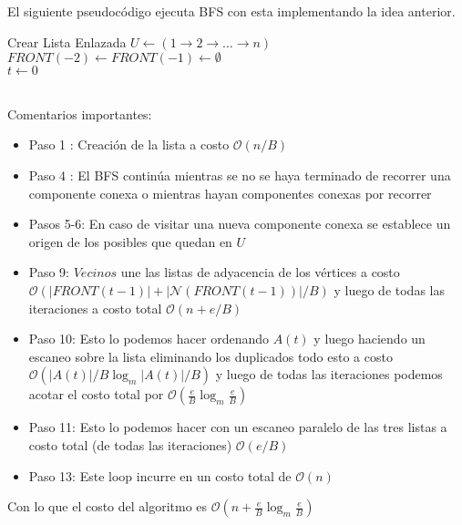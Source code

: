 \documentclass[dcc,uchile]{fcfmcourse}
\theoremstyle{plain}
\theoremstyle{definition}
\begin{document}
\begin{problems}
El siguiente pseudocódigo ejecuta BFS con esta implementando la idea anterior.
\begin{algorithm}
Crear Lista Enlazada $U \gets (1\to 2\to \ldots \to n)$\\
$FRONT(-2)\gets FRONT(-1) \gets \emptyset$\\
$t\gets 0$\\
\end{algorithm}\\

Comentarios importantes:
\begin{itemize}
    \item Paso 1 : Creación de la lista a costo $\mathcal{O}(n/B)$
    \item Paso 4 : El BFS continúa mientras se no se haya terminado de recorrer una componente conexa o mientras hayan componentes conexas por recorrer
    \item Pasos 5-6: En caso de visitar una nueva componente conexa se establece un origen de los posibles que quedan en $U$
    \item Paso 9: $Vecinos$ une las listas de adyacencia de los vértices a costo $\mathcal{O}(|FRONT(t-1)| + |\mathcal{N}(FRONT(t-1))|/B)$ y luego de todas las iteraciones a costo total $\mathcal{O}(n + e/B)$
    \item Paso 10: Esto lo podemos hacer ordenando $A(t)$ y luego haciendo un escaneo sobre la lista eliminando los duplicados todo esto a costo $\mathcal{O}(|A(t)|/B\log_m |A(t)|/B)$ y luego de todas las iteraciones podemos acotar el costo total por $\mathcal{O}(\frac{e}{B}\log_{m} \frac{e}{B})$
    \item Paso 11: Esto lo podemos hacer con un escaneo paralelo de las tres listas a costo total (de todas las iteraciones) $\mathcal{O}(e/B)$
    \item Paso 13: Este loop incurre en un costo total de $\mathcal{O}(n)$
\end{itemize}
Con lo que el costo del algoritmo es $\mathcal{O}(n + \frac{e}{B}\log_{m} \frac{e}{B})$
\end{problems}
\end{document}
